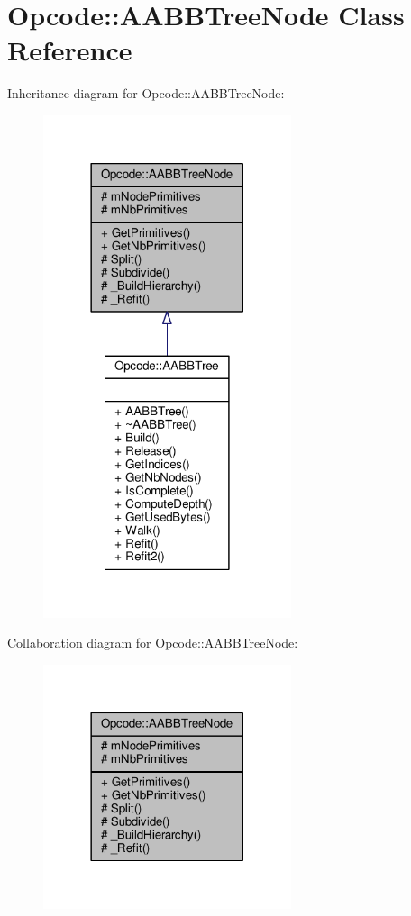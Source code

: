 \hypertarget{classOpcode_1_1AABBTreeNode}{}\section{Opcode\+:\+:A\+A\+B\+B\+Tree\+Node Class Reference}
\label{classOpcode_1_1AABBTreeNode}


Inheritance diagram for Opcode\+:\+:A\+A\+B\+B\+Tree\+Node\+:
\nopagebreak
\begin{figure}[H]
\begin{center}
\leavevmode
\includegraphics[width=206pt]{d5/d98/classOpcode_1_1AABBTreeNode__inherit__graph}
\end{center}
\end{figure}


Collaboration diagram for Opcode\+:\+:A\+A\+B\+B\+Tree\+Node\+:
\nopagebreak
\begin{figure}[H]
\begin{center}
\leavevmode
\includegraphics[width=206pt]{d9/df3/classOpcode_1_1AABBTreeNode__coll__graph}
\end{center}
\end{figure}
